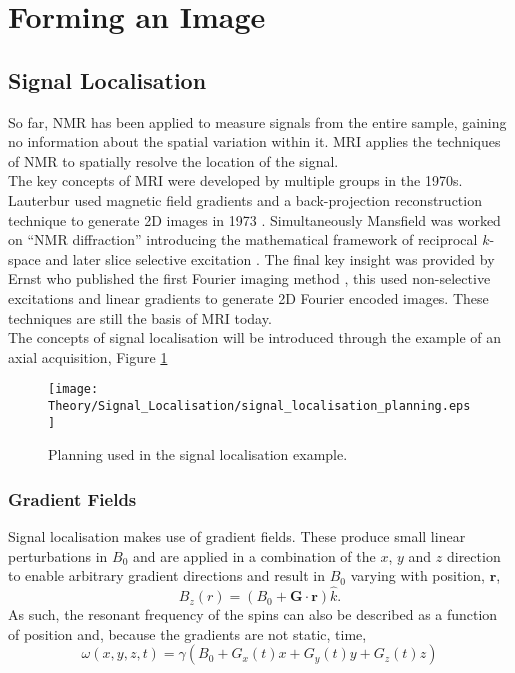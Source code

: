 \newpage
\section{Forming an Image}
\label{sec:theory_forming_an_image}
\subsection{Signal Localisation}
So far, \ac{NMR} has been applied to measure signals from the entire sample, gaining no information about the spatial variation within it. \ac{MRI} applies the techniques of \ac{NMR} to spatially resolve the location of the signal.\\

The key concepts of \ac{MRI} were developed by multiple groups in the 1970s. Lauterbur used magnetic field gradients and a back-projection reconstruction technique to generate 2D images in 1973 \cite{lauterbur_image_1973}. Simultaneously Mansfield was worked on ``\ac{NMR} diffraction'' introducing the mathematical framework of reciprocal $k$-space \cite{mansfield_nmr_1973} and later slice selective excitation \cite{garroway_image_1974}. The final key insight was provided by Ernst who published the first Fourier imaging method \cite{kumar_nmr_1975}, this used non-selective excitations and linear gradients to generate 2D Fourier encoded images. These techniques are still the basis of \ac{MRI} today.\\

The concepts of signal localisation will be introduced through the example of an axial acquisition, Figure \ref{fig:theory_axial_planning}
\begin{figure}[H]
	\centering
	\texttt{[image: Theory/Signal\_Localisation/signal\_localisation\_planning.eps]}
	\caption{Planning used in the signal localisation example.}
	\label{fig:theory_axial_planning}	
\end{figure}
\subsubsection{Gradient Fields}
Signal localisation makes use of gradient fields. These produce small linear perturbations in $B_0$ and are applied in a combination of the $x$, $y$ and $z$ direction to enable arbitrary gradient directions and result in $B_0$ varying with position, $\mathbf{r}$,
\begin{equation}
B_z\left( r\right) =\left( B_0 + \mathbf{G \cdot r}\right) \hat{k}.
\end{equation}
As such, the resonant frequency of the spins can also be described as a function of position and, because the gradients are not static, time,
\begin{equation}
\omega\left( x, y, z, t \right) = \gamma \left( B_0 + G_x(t)x + G_y(t)y + G_z(t)z \right) 
\label{eq:theory_localisation_gradients}
\end{equation}
